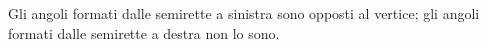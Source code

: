 Gli angoli formati dalle semirette a sinistra sono opposti al vertice; gli angoli formati dalle semirette a destra non lo sono.

\begin{comment}

Sappiamo che nel corso degli studi o nell’attività lavorativa possono presentarsi problemi di diversa natura: di tipo economico, scientifico, sociale; possono riguardare insiemi numerici o figure geometriche. La matematica ci può aiutare a risolvere i problemi quando essi possono essere tradotti in “forma matematica”, quando cioè è possibile trascrivere in simboli le relazioni che intercorrono tra le grandezze presenti nel problema e quando si può costruire, tramite queste relazioni, un modello matematico che ci permetta di raggiungere la soluzione al quesito.

Affronteremo problemi di tipo algebrico o geometrico, che potranno essere formalizzati attraverso equazioni di secondo grado in una sola incognita.
Teniamo presente, prima di buttarci nella risoluzione del problema, alcuni passi che ci aiuteranno a costruire il modello matematico:
\begin{itemize*}
\item la lettura “attenta” del testo al fine di individuare l’ambiente del problema, le parole chiave, i dati e le informazioni implicite, l’obiettivo;
\item la scelta della grandezza incognita del problema, la descrizione dell’insieme in cui si ricerca il suo valore, le condizioni che devono essere soddisfatte dall’incognita;
\item la traduzione in “forma matematica” delle relazioni che intercorrono tra i dati e l’obiettivo, cioè l’individuazione del modello matematico (equazione risolvente).
\end{itemize*}
\begin{center}
 
\end{center}

\begin{center}
 
\end{center}

\begin{center}
 
\end{center}

\begin{center}
 
\end{center}


\end{comment}
